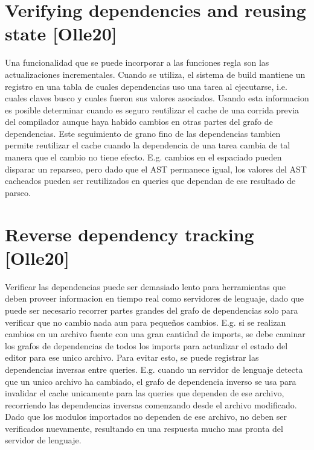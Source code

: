\documentclass[12pt, a4paper]{report}
\begin{document}
  \section*{Verifying dependencies and reusing state [Olle20]}

    Una funcionalidad que se puede incorporar a las funciones regla son las actualizaciones incrementales.
    Cuando se utiliza, el sistema de build mantiene un registro en una tabla de cuales dependencias uso una tarea al ejecutarse, i.e. cuales claves busco y cuales fueron sus valores asociados.
    Usando esta informacion es posible determinar cuando es seguro reutilizar el cache de una corrida previa del compilador aunque haya habido cambios en otras partes del grafo de dependencias.
    Este seguimiento de grano fino de las dependencias tambien permite reutilizar el cache cuando la dependencia de una tarea cambia de tal manera que el cambio no tiene efecto.
    E.g. cambios en el espaciado pueden disparar un reparseo, pero dado que el AST permanece igual, los valores del AST cacheados pueden ser reutilizados en queries que dependan de ese resultado de parseo.
    \cite{olle_query_based}

  \section*{Reverse dependency tracking [Olle20]}

    Verificar las dependencias puede ser demasiado lento para herramientas que deben proveer informacion en tiempo real como servidores de lenguaje, dado que puede ser necesario recorrer partes grandes del grafo de dependencias solo para verificar que no cambio nada aun para pequeños cambios.
    E.g. si se realizan cambios en un archivo fuente con una gran cantidad de imports, se debe caminar los grafos de dependencias de todos los imports para actualizar el estado del editor para ese unico archivo.
    Para evitar esto, se puede registrar las dependencias inversas entre queries.
    E.g. cuando un servidor de lenguaje detecta que un unico archivo ha cambiado, el grafo de dependencia inverso se usa para invalidar el cache unicamente para las queries que dependen de ese archivo, recorriendo las dependencias inversas comenzando desde el archivo modificado.
    Dado que los modulos importados no dependen de ese archivo, no deben ser verificados nuevamente, resultando en una respuesta mucho mas pronta del servidor de lenguaje.
    \cite{olle_query_based}
\end{document}
